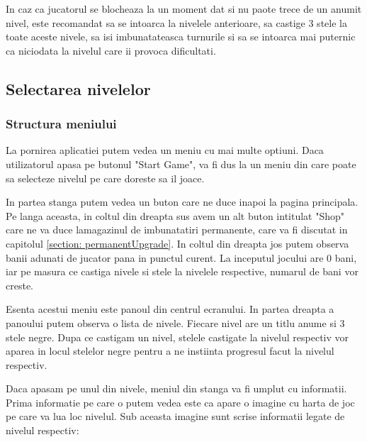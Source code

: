 \documentclass[12pt, a4paper]{article}
\begin{document}
	In caz ca jucatorul se blocheaza la un moment dat si nu paote trece de un anumit nivel, este recomandat sa se intoarca la nivelele anterioare, sa castige 3 stele la toate aceste nivele, sa isi imbunatateasca turnurile si sa se intoarca mai puternic ca niciodata la nivelul care ii provoca dificultati.
	
	
	
	
	
	\subsection{Selectarea nivelelor}
	\label{section: levelSelection}
	
	\subsubsection{Structura meniului}
	
	La pornirea aplicatiei putem vedea un meniu cu mai multe optiuni. Daca utilizatorul apasa pe butonul "Start Game", va fi dus la un meniu din care poate sa selecteze nivelul pe care doreste sa il joace.
	
	In partea stanga putem vedea un buton care ne duce inapoi la pagina principala. Pe langa aceasta, in coltul din dreapta sus avem un alt buton intitulat "Shop" care ne va duce lamagazinul de imbunatatiri permanente, care va fi discutat in capitolul \ref{section: permanentUpgrade}. In coltul din dreapta jos putem observa banii adunati de jucator pana in punctul curent. La inceputul jocului are 0 bani, iar pe masura ce castiga nivele si stele la nivelele respective, numarul de bani vor creste.
	\newline
	
	Esenta acestui meniu este panoul din centrul ecranului. In partea dreapta a panoului putem observa o lista de nivele. Fiecare nivel are un titlu anume si 3 stele negre. Dupa ce castigam un nivel, stelele castigate la nivelul respectiv vor aparea in locul stelelor negre pentru a ne instiinta progresul facut la nivelul respectiv.
	\newline
	
	Daca apasam pe unul din nivele, meniul din stanga va fi umplut cu informatii. Prima informatie pe care o putem vedea este ca apare o imagine cu harta de joc pe care va lua loc nivelul. Sub aceasta imagine sunt scrise informatii legate de nivelul respectiv:
	
\end{document}
